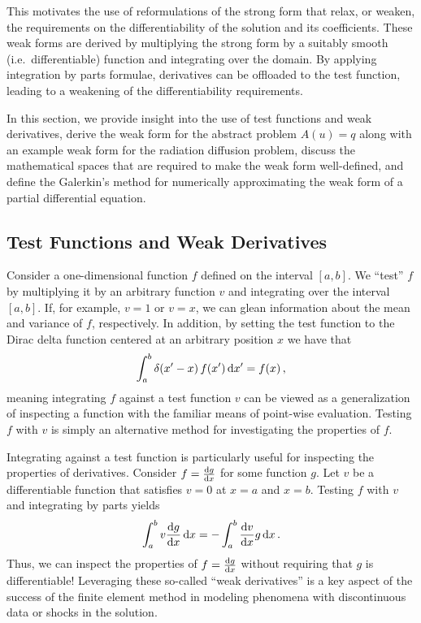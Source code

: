 \documentclass[../doc.tex]{subfiles}
\begin{document}
This motivates the use of reformulations of the strong form that relax, or weaken, the requirements on the differentiability of the solution and its coefficients. These weak forms are derived by multiplying the strong form by a suitably smooth (i.e.~differentiable) function and integrating over the domain. By applying integration by parts formulae, derivatives can be offloaded to the test function, leading to a weakening of the differentiability requirements. 

In this section, we provide insight into the use of test functions and weak derivatives, derive the weak form for the abstract problem $A(u) = q$ along with an example weak form for the radiation diffusion problem, discuss the mathematical spaces that are required to make the weak form well-defined, and define the Galerkin's method for numerically approximating the weak form of a partial differential equation. 

\subsection{Test Functions and Weak Derivatives}
Consider a one-dimensional function $f$ defined on the interval $[a,b]$. We ``test'' $f$ by multiplying it by an arbitrary function $v$ and integrating over the interval $[a,b]$. If, for example, $v = 1$ or $v=x$, we can glean information about the mean and variance of $f$, respectively. In addition, by setting the test function to the Dirac delta function centered at an arbitrary position $x$ we have that 
	\begin{equation}
		\int_a^b \delta(x' - x)\, f(x') \mathop{}\!\mathrm{d} x' = f(x) \,, 
	\end{equation}
meaning integrating $f$ against a test function $v$ can be viewed as a generalization of inspecting a function with the familiar means of point-wise evaluation. Testing $f$ with $v$ is simply an alternative method for investigating the properties of $f$. 

Integrating against a test function is particularly useful for inspecting the properties of derivatives. Consider $f = \frac{\mathop{}\!\mathrm{d} g}{\mathop{}\!\mathrm{d} x}$ for some function $g$. Let $v$ be a differentiable function that satisfies $v = 0$ at $x = a$ and $x=b$. Testing $f$ with $v$ and integrating by parts yields 
	\begin{equation}
		\int_a^b v\frac{\mathop{}\!\mathrm{d} g}{\mathop{}\!\mathrm{d} x} \mathop{}\!\mathrm{d} x = -\int_a^b \frac{\mathop{}\!\mathrm{d} v}{\mathop{}\!\mathrm{d} x} g \mathop{}\!\mathrm{d} x \,. 
	\end{equation}
Thus, we can inspect the properties of $f = \frac{\mathop{}\!\mathrm{d} g}{\mathop{}\!\mathrm{d} x}$ without requiring that $g$ is differentiable! Leveraging these so-called ``weak derivatives'' is a key aspect of the success of the finite element method in modeling phenomena with discontinuous data or shocks in the solution. 
\end{document}
